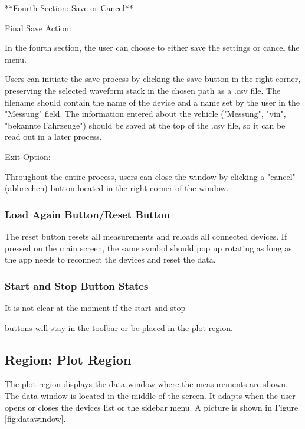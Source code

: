 \documentclass[]{scrreprt}
\begin{document}
**Fourth Section: Save or Cancel**

Final Save Action:

In the fourth section, the user can choose to either save the settings or cancel the menu.

Users can initiate the save process by clicking the save button in the right corner, preserving the selected waveform stack in the chosen path as a .csv file. The filename should contain the name of the device and a name set by the user in the "Messung" field. The information entered about the vehicle ("Messung", "vin", "bekannte Fahrzeuge") should be saved at the top of the .csv file, so it can be read out in a later process.

Exit Option:

Throughout the entire process, users can close the window by clicking a "cancel" (abbrechen) button located in the right corner of the window.

\subsubsection{Load Again Button/Reset Button}

The reset button resets all measurements and reloads all connected devices. If pressed on the main screen, the same symbol should pop up rotating as long as the app needs to reconnect the devices and reset the data.

\subsubsection{Start and Stop Button States}

It is not clear at the moment if the start and stop

 buttons will stay in the toolbar or be placed in the plot region.

\subsection{Region: Plot Region}

The plot region displays the data window where the measurements are shown. The data window is located in the middle of the screen. It adapts when the user opens or closes the devices list or the sidebar menu. A picture is shown in Figure \ref{fig:datawindow}.
\end{document}

